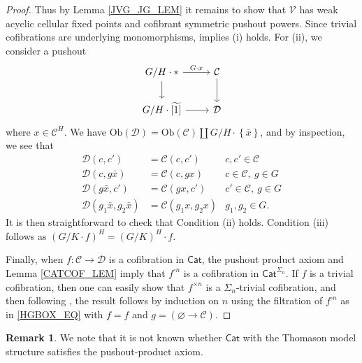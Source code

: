 \documentclass[a4paper,10pt
,draft
]{article}%
\numberwithin{equation}{section}
\numberwithin{figure}{section}
\theoremstyle{definition} %
\newtheorem{remark}[equation]{Remark}%
\newcommand{\set}[1]{\left\{#1\right\}}%
\newcommand{\Cat}{\mathsf{Cat}}
\newcommand{\V}{\ensuremath{\mathcal V}}
\newcommand{\1}{\ensuremath{\mathbbm 1}}%
\begin{document}
\begin{proof}
      Thus by Lemma \ref{JVG_JG_LEM} it remains to show that $\V$ has weak acyclic cellular fixed points and cofibrant symmetric pushout powers.
      Since trivial cofibrations are underlying monomorphisms, \cite[Prop. 2.3]{BMOOPY15} implies (i) holds.
      For (ii), we consider a pushout
      \[
            \begin{tikzcd}
                  G/H \cdot \** \arrow[d] \arrow[r, "G \cdot x"]
                  &
                  \mathcal C \arrow[d]
                  \\
                  G/H \cdot \widetilde{[1]} \arrow[r]
                  &
                  \mathcal D                  
            \end{tikzcd}
      \]
      where $x \in \mathcal C^H$.
      We have
      $\mathrm{Ob}(\mathcal D) = \mathrm{Ob}(\mathcal C) \amalg G/H \cdot \set{\bar x}$,
      and by inspection, we see that
      \begin{align*}
        \mathcal D(c,c') & = \mathcal C(c,c') & c,c' \in \mathcal C
        \\
        \mathcal D(c, g\bar x) & = \mathcal C(c, gx) & c \in \mathcal C,\ g \in G
        \\
        \mathcal D(g \bar x, c') & = \mathcal C(g x,c') & c' \in \mathcal C,\ g \in G
        \\
        \mathcal D(g_1 \bar x, g_2 \bar x) & = \mathcal C(g_1 x, g_2 x) & g_1,g_2 \in G.
      \end{align*} 
      It is then straightforward to check that Condition (ii) holds.
      Condition (iii) follows as $(G/K \cdot f)^H = (G/K)^H \cdot f$.

      Finally, when $f \colon \mathcal C \to \mathcal D$ is a cofibration in $\Cat$, the pushout product axiom and Lemma \ref{CATCOF_LEM} imply that $f^{\square n}$ is a cofibration in $\Cat^{\Sigma_n}$.
      If $f$ is a trivial cofibration, then one can easily show that $f^{\times n}$ is a $\Sigma_n$-trivial cofibration,
      and then following \cite[Remark 6.18]{BP_geo},
      the result follows by induction on $n$
      using the filtration of $f^{\square n}$ as in \eqref{HGBOX_EQ} with $f = f$ and $g = (\varnothing \to \mathcal C)$.
\end{proof}

\begin{remark}
      We note that it is not known whether $\Cat$ with the Thomason model structure satisfies the pushout-product axiom.
\end{remark}
\end{document}
